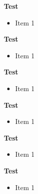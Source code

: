 \textbf{Test}
\begin{itemize}
\item Item 1
\end{itemize}
\textbf{Test}
\begin{itemize}
\item Item 1
\end{itemize}
\textbf{Test}
\begin{itemize}
\item Item 1
\end{itemize}
\begin{frame}[t]
\textbf{Test}
\begin{itemize}
\item Item 1
\end{itemize}
\end{frame}

\begin{frame}[t]
\textbf{Test}
\begin{itemize}
\item Item 1
\end{itemize}
\end{frame}

\begin{frame}[t]
\textbf{Test}
\begin{itemize}
\item Item 1
\end{itemize}
\end{frame}

